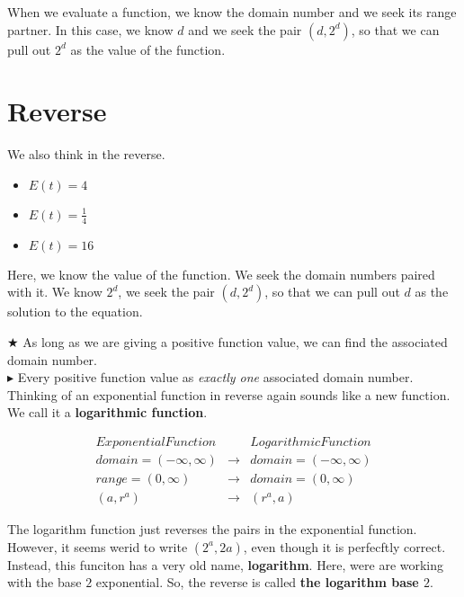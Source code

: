 \documentclass{ximera}
\begin{document}
When we evaluate a function, we know the domain number and we seek its range partner. In this case, we know $d$ and we seek the pair $(d, 2^d)$, so that we can pull out $2^d$ as the value of the function.





\section{Reverse}

We also think in the reverse.
\begin{itemize}
\item $E(t) = 4$
\item $E(t) = {\tfrac{1}{4}} $
\item $E(t) = 16 $
\end{itemize}


Here, we know the value of the function.  We seek the domain numbers paired with it. We know $2^d$, we seek the pair $(d, 2^d)$, so that we can pull out $d$ as the solution to the equation.




$\bigstar$ As long as we are giving a positive function value, we can find the associated domain number. \\ 



$\blacktriangleright$ Every positive function value as \textit{exactly one} associated domain number. \\ 




Thinking of an exponential function in reverse again sounds like a new function. We call it a \textbf{logarithmic function}.






\[
\begin{array}{lcl}
Exponential Function  &     &  Logarithmic Function  \\
domain = (-\infty, \infty)  &  \longrightarrow  &  domain = (-\infty, \infty)  \\
range = (0, \infty)  &  \longrightarrow  &  domain = (0, \infty)  \\
(a, r^a)    &  \longrightarrow  &   (r^a, a)
\end{array}
\]


The logarithm function just reverses the pairs in the exponential function.  However, it seems werid to write $(2^a, 2a)$, even though it is perfecftly correct.  Instead, this funciton has a very old name, \textbf{logarithm}.  Here, were are working with the base $2$ exponential. So, the reverse is called \textbf{the logarithm base $2$}.
\end{document}
